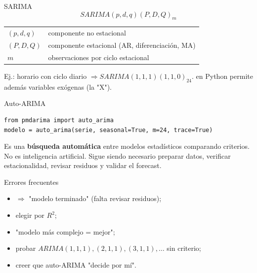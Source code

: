 \begin{frame}{SARIMA}
\[
SARIMA(p,d,q)(P,D,Q)_m
\]
\begin{center}
\begin{tabular}{ll}
\toprule
$(p,d,q)$ & componente no estacional\\
$(P,D,Q)$ & componente estacional (AR, diferenciación, MA)\\
$m$ & observaciones por ciclo estacional\\
\bottomrule
\end{tabular}
\end{center}
Ej.: horario con ciclo diario $\Rightarrow SARIMA(1,1,1)(1,1,0)_{24}$.
 en Python permite además variables exógenas (la "X").
\end{frame}

\begin{frame}[fragile]{Auto-ARIMA}
\begin{lstlisting}
from pmdarima import auto_arima
modelo = auto_arima(serie, seasonal=True, m=24, trace=True)
\end{lstlisting}
Es una \textbf{búsqueda automática} entre modelos estadísticos comparando criterios.
No es inteligencia artificial.
Sigue siendo necesario preparar datos, verificar estacionalidad, revisar residuos y validar el forecast.
\end{frame}

\begin{frame}{Errores frecuentes}
\begin{itemize}
  \item {} $\Rightarrow$ "modelo terminado" (falta revisar residuos);
  \item elegir por $R^2$;
  \item "modelo más complejo = mejor";
  \item probar $ARIMA(1,1,1),(2,1,1),(3,1,1),\dots$ sin criterio;
  \item creer que auto-ARIMA "decide por mí".
\end{itemize}
\end{frame}

